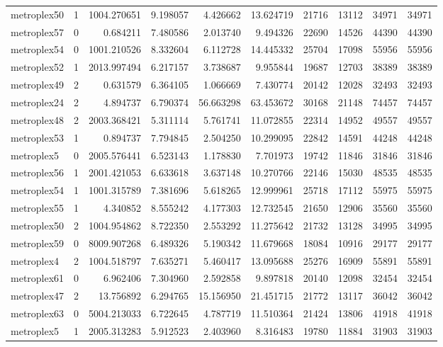 \begin{longtable}{|l|r|r|r|r|r|r|r|r|r|}
metroplex50 & 1 & 1004.270651 & 9.198057 & 4.426662 & 13.624719 & 21716 & 13112 & 34971 & 34971 \\
metroplex57 & 0 & 0.684211 & 7.480586 & 2.013740 & 9.494326 & 22690 & 14526 & 44390 & 44390 \\
metroplex54 & 0 & 1001.210526 & 8.332604 & 6.112728 & 14.445332 & 25704 & 17098 & 55956 & 55956 \\
metroplex52 & 1 & 2013.997494 & 6.217157 & 3.738687 & 9.955844 & 19687 & 12703 & 38389 & 38389 \\
metroplex49 & 2 & 0.631579 & 6.364105 & 1.066669 & 7.430774 & 20142 & 12028 & 32493 & 32493 \\
metroplex24 & 2 & 4.894737 & 6.790374 & 56.663298 & 63.453672 & 30168 & 21148 & 74457 & 74457 \\
metroplex48 & 2 & 2003.368421 & 5.311114 & 5.761741 & 11.072855 & 22314 & 14952 & 49557 & 49557 \\
metroplex53 & 1 & 0.894737 & 7.794845 & 2.504250 & 10.299095 & 22842 & 14591 & 44248 & 44248 \\
metroplex5 & 0 & 2005.576441 & 6.523143 & 1.178830 & 7.701973 & 19742 & 11846 & 31846 & 31846 \\
metroplex56 & 1 & 2001.421053 & 6.633618 & 3.637148 & 10.270766 & 22146 & 15030 & 48535 & 48535 \\
metroplex54 & 1 & 1001.315789 & 7.381696 & 5.618265 & 12.999961 & 25718 & 17112 & 55975 & 55975 \\
metroplex55 & 1 & 4.340852 & 8.555242 & 4.177303 & 12.732545 & 21650 & 12906 & 35560 & 35560 \\
metroplex50 & 2 & 1004.954862 & 8.722350 & 2.553292 & 11.275642 & 21732 & 13128 & 34995 & 34995 \\
metroplex59 & 0 & 8009.907268 & 6.489326 & 5.190342 & 11.679668 & 18084 & 10916 & 29177 & 29177 \\
metroplex4 & 2 & 1004.518797 & 7.635271 & 5.460417 & 13.095688 & 25276 & 16909 & 55891 & 55891 \\
metroplex61 & 0 & 6.962406 & 7.304960 & 2.592858 & 9.897818 & 20140 & 12098 & 32454 & 32454 \\
metroplex47 & 2 & 13.756892 & 6.294765 & 15.156950 & 21.451715 & 21772 & 13117 & 36042 & 36042 \\
metroplex63 & 0 & 5004.213033 & 6.722645 & 4.787719 & 11.510364 & 21424 & 13806 & 41918 & 41918 \\
metroplex5 & 1 & 2005.313283 & 5.912523 & 2.403960 & 8.316483 & 19780 & 11884 & 31903 & 31903 \\

\end{longtable}
